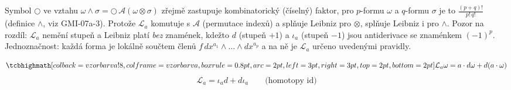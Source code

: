 \begin{vysvetleni}
Symbol $\bigcirc$ ve vztahu $\omega\wedge\sigma=\bigcirc\,\mathcal{A}(\omega\otimes\sigma)$ zřejmě zastupuje kombinatorický (číselný) faktor, pro $p$-formu $\omega$ a $q$-formu $\sigma$ je to $\frac{(p+q)!}{p!\,q!}$ (definice $\wedge$, viz GMI-07a-3). Protože $\mathcal{L}_a$ komutuje s $\mathcal{A}$ (permutace indexů) a splňuje Leibniz pro $\otimes$, splňuje Leibniz i pro $\wedge$.
Pozor na rozdíl: $\mathcal{L}_a$ nemění stupeň a Leibniz platí \emph{bez} znamének, kdežto $d$ (stupeň $+1$) a $\iota_a$ (stupeň $-1$) jsou antiderivace se znaménkem $(-1)^p$.
Jednoznačnost: každá forma je lokálně součtem členů $f\,dx^{a_1}\wedge\dots\wedge dx^{a_p}$ a na ně je $\mathcal{L}_a$ určeno uvedenými pravidly.
\end{vysvetleni}

\begin{veta}
\[
  \vzorec{\mathcal{L}_a\omega = a\cdot d\omega + d(a\cdot\omega)}
\]
\[
  \mathcal{L}_a = \iota_ad + d\iota_a \qquad\text{(homotopy id)}
\]
\end{veta}

